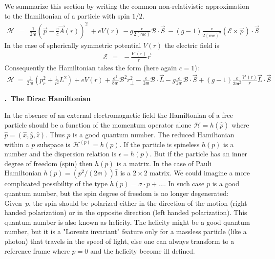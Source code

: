 \documentclass[onecolumn,fleqn, 11pt]{revtex4}
\newcommand{\mass}{\mathsf{m}}
\newcommand{\beq}{\begin{eqnarray}}
\newcommand{\eeq}{\end{eqnarray}}
\renewcommand{\thesubsection}{\arabic{subsection}}
\renewcommand{\thesubsubsection}{\arabic{subsubsection}}
\newcommand{\sheadC}[1]
{
\addtocounter{subsubsection}{1}
\vspace{5mm}
{\bf \thesubsection.\thesubsubsection \ #1}  
\nopagebreak
\phantomsection
}
\begin{document}
We summarize this section by writing the common non-relativistic 
approximation to the Hamiltonian of a particle with spin $1/2$. 
\beq
\mathcal{H} \ \ = \ \ \frac{1}{2\mass}\left( \vec{p}-\frac{e}{c}\vec{A}(r) \right)^2
\ +eV(r) 
\ -g\frac{e}{2(\mass c)} \mathcal{B} \cdot \vec{S} 
\ -(g{-}1)\frac{e}{2(\mass c)^2} (\mathcal{E}\times \vec{p}) \cdot \vec{S} 
\eeq
In the case of spherically symmetric potential $V(r)$ 
the electric field is 
\beq
\mathcal{E} \ \ = \ \ - \frac{V'(r)}{r}\vec{r}
\eeq
Consequently the Hamiltonian takes the form (here again $c{=}1$):
\beq
\mathcal{H} 
\ = \  
\frac{1}{2\mass}\left( p_r^2 + \frac{1}{r^2} L^2 \right) 
+ eV(r) + \frac{e^2}{8\mass}\mathcal{B}^2 r_{\perp}^2
-\frac{e}{2\mass} \mathcal{B} \cdot \vec{L}
-g\frac{e}{2\mass} \mathcal{B} \cdot \vec{S}
+ (g{-}1)\frac{e}{2\mass^2}\frac{V'(r)}{r} \vec{L} \cdot \vec{S} 
\eeq





\newpage
\sheadC{The Dirac Hamiltonian}

In the absence of an external electromagnetic field the 
Hamiltonian of a free particle should be a function of 
the momentum operator alone $\mathcal{H}=h(\hat{p})$ 
where ${\hat{p}=(\hat{x},\hat{y},\hat{z})}$. 
Thus $p$ is a good quantum number. The reduced Hamiltonian 
within a $p$ subspace is $\mathcal{H}^{(p)}=h(p)$. 
If the particle is spineless $h(p)$ is a number 
and the dispersion relation is $\epsilon=h(p)$. 
But if the particle has an inner degree of freedom (spin) 
then $h(p)$ is a matrix. 
In the case of Pauli Hamiltonian ${h(p)=(p^2/(2\mass))\hat{1}}$ 
is a ${2 \times 2}$ matrix. We could imagine a more complicated 
possibility of the type ${h(p)= \sigma \cdot p + ...}$. 
In such case $p$ is a good quantum number, 
but the spin degree of freedom is no longer degenerated:   
Given~$p$, the spin should be polarized either 
in the direction of the motion (right handed polarization) 
or in the opposite direction (left handed polarization).
This quantum number is also known as helicity.
The helicity might be a good quantum number, 
but it is a "Lorentz invariant" feature only for 
a massless particle (like a photon) that travels 
in the speed of light, else one can always transform 
to a reference frame where $p=0$ 
and the helicity become ill defined.   
\end{document}
